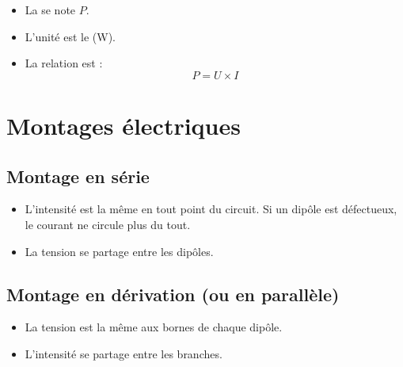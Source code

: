 \documentclass[12pt]{article}
\begin{document}
\begin{itemize}
    \item La  se note \(P\).
    \item L’unité est le  (W).
    \item La relation est :
\[
P = U \times I
\]
\end{itemize}

\section{Montages électriques}

\subsection{Montage en série}
\begin{center}
\end{center}

\begin{itemize}
    \item L’intensité est la même en tout point du circuit. Si un dipôle est défectueux, le courant ne circule plus du tout.
    \item La tension se partage entre les dipôles.
\end{itemize}

\subsection{Montage en dérivation (ou en parallèle)}
\begin{center}
\end{center}
\begin{itemize}
    \item La tension est la même aux bornes de chaque dipôle.
    \item L’intensité se partage entre les branches.
\end{itemize}
\end{document}
